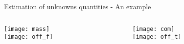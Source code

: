 \begin{frame}{Estimation of unknowns quantities - An example}
  \vskip0.1in
  \begin{columns}
    \begin{column}{0.5\textwidth}
      \texttt{[image: mass]}\\
      \texttt{[image: off\_f]}
    \end{column}
    \begin{column}{0.5\textwidth}
      \texttt{[image: com]}\\
      \texttt{[image: off\_t]}
    \end{column}
  \end{columns}
\end{frame}

